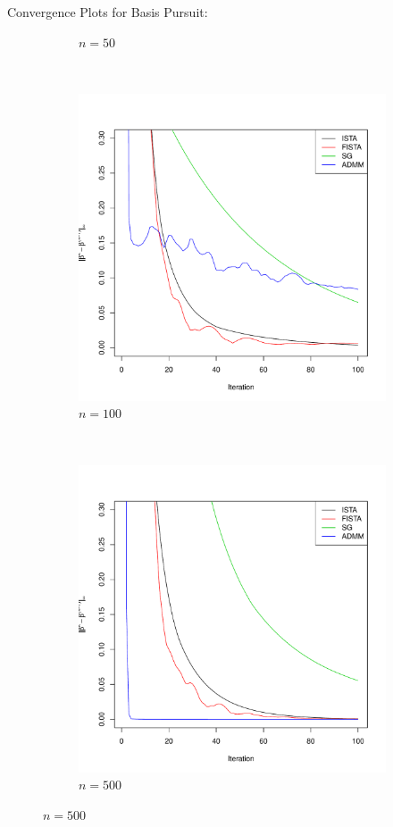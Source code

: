 \documentclass[xcolor=dvipsnames,aspectratio=1610]{beamer}
\theoremstyle{remark}
\begin{document}
\begin{frame}{Convergence Plots for Basis Pursuit:}
\begin{figure}[H]
\begin{subfigure}[b]{0.2\textwidth}
        \caption{$n=50$}
        \label{fig:50}
    \end{subfigure}
\\
    \begin{subfigure}[b]{0.2\textwidth}
        \includegraphics[width=\textwidth]{100cvgc.pdf}
        \caption{$n=100$}
        \label{fig:100}
    \end{subfigure}
~
    \begin{subfigure}[b]{0.2\textwidth}
        \includegraphics[width=\textwidth]{500cvgc.pdf}
        \caption{$n=500$}
        \label{fig:500}
    \end{subfigure}
\label{fig:cvgc}
\end{figure}
\end{frame}
\end{document}
